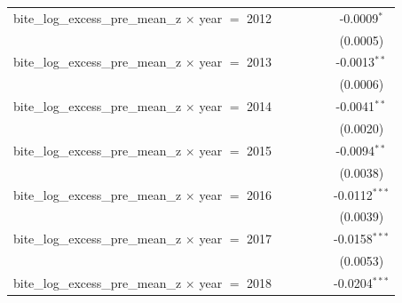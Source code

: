 \begin{tabular}{lccccc}
   bite\_log\_excess\_pre\_mean\_z $\times$ year $=$ 2012       &                    &                 &                       &                            & -0.0009$^{*}$\\   
                                                                &                    &                 &                       &                            & (0.0005)\\   
   bite\_log\_excess\_pre\_mean\_z $\times$ year $=$ 2013       &                    &                 &                       &                            & -0.0013$^{**}$\\   
                                                                &                    &                 &                       &                            & (0.0006)\\   
   bite\_log\_excess\_pre\_mean\_z $\times$ year $=$ 2014       &                    &                 &                       &                            & -0.0041$^{**}$\\   
                                                                &                    &                 &                       &                            & (0.0020)\\   
   bite\_log\_excess\_pre\_mean\_z $\times$ year $=$ 2015       &                    &                 &                       &                            & -0.0094$^{**}$\\   
                                                                &                    &                 &                       &                            & (0.0038)\\   
   bite\_log\_excess\_pre\_mean\_z $\times$ year $=$ 2016       &                    &                 &                       &                            & -0.0112$^{***}$\\   
                                                                &                    &                 &                       &                            & (0.0039)\\   
   bite\_log\_excess\_pre\_mean\_z $\times$ year $=$ 2017       &                    &                 &                       &                            & -0.0158$^{***}$\\   
                                                                &                    &                 &                       &                            & (0.0053)\\   
   bite\_log\_excess\_pre\_mean\_z $\times$ year $=$ 2018       &                    &                 &                       &                            & -0.0204$^{***}$\\   

\end{tabular}
